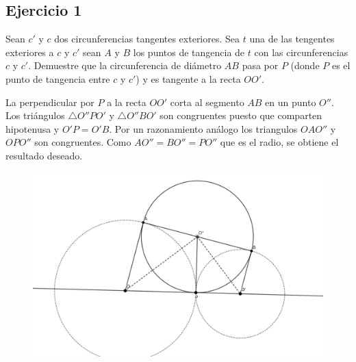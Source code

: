 


		\thispagestyle{plain}
		\subsection*{Ejercicio 1}
		Sean $c'$ y $c$ dos circunferencias tangentes exteriores. Sea $t$ una de las tengentes exteriores a $c$ y $c'$ sean $A$ y $B$ los puntos de tangencia de $t$ con las circunferencias $c$ y $c'$. Demuestre que la circunferencia de diámetro $AB$ pasa por $P$ (donde $P$ es el punto de tangencia entre $c$ y $c'$) y es tangente a la recta $OO'$.
		
		\begin{sol}
			La perpendicular por $P$ a la recta $OO'$ corta al segmento $AB$ en un punto $O''$. Los triángulos $\triangle O''PO'$ y $\triangle O''BO'$ son congruentes puesto que comparten hipotenusa y $O'P=O'B$. Por un razonamiento análogo los triangulos $OAO''$ y $OPO''$ son congruentes. Como $AO''=BO''=PO''$ que es el radio, se obtiene el resultado deseado.
			\begin{figure}[H]\centering
				\includegraphics[width=1\linewidth]{pics/g3}
			\end{figure}
		\end{sol}
